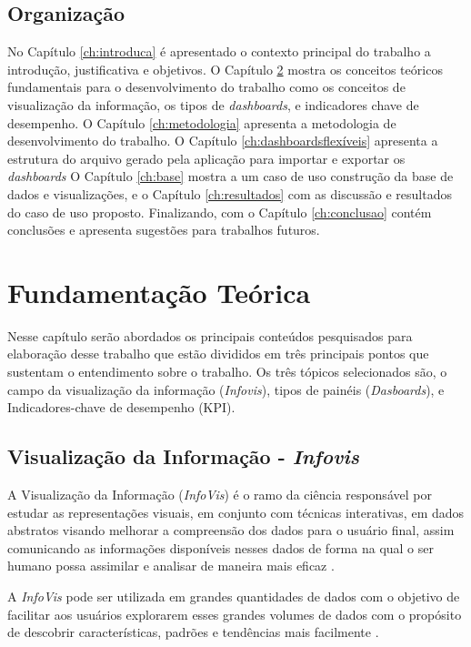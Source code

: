 \documentclass[
	12pt,				%
	openright,			%
	oneside,			%
	a4paper,			%
	english,			%
	brazil				%
	]{abntex2}
\begin{document}
\section{Organização}
\label{ch:organizacao}

No Capítulo \ref{ch:introduca} é apresentado o contexto principal do trabalho a introdução, justificativa e objetivos. O Capítulo \ref{ch:fundamentacao} mostra os conceitos teóricos fundamentais para o desenvolvimento do trabalho como os conceitos de visualização da informação, os tipos de \textit{dashboards}, e indicadores chave de desempenho. O  
Capítulo \ref{ch:metodologia} apresenta a metodologia de desenvolvimento do trabalho. O Capítulo \ref{ch:dashboardsflexíveis} apresenta a estrutura do arquivo gerado pela aplicação para importar e exportar os \textit{dashboards}
O Capítulo \ref{ch:base} mostra a um caso de uso construção da base de dados e visualizações, e o Capítulo \ref{ch:resultados} com as discussão e resultados do caso de uso proposto. Finalizando, com o Capítulo \ref{ch:conclusao} contém conclusões e apresenta sugestões para trabalhos futuros.





\chapter{Fundamentação Teórica}
\label{ch:fundamentacao}


Nesse capítulo serão abordados os principais conteúdos pesquisados para elaboração desse trabalho que estão divididos em três principais pontos que sustentam o entendimento sobre o trabalho. Os três tópicos selecionados são, o campo da visualização da informação (\textit{Infovis}), tipos de painéis (\textit{Dasboards}), e Indicadores-chave de desempenho (KPI).

\section{Visualização da Informação - \textit{Infovis}}
A Visualização da Informação (\textit{InfoVis}) é o ramo da ciência responsável por estudar as representações visuais, em conjunto com técnicas interativas, em dados abstratos visando melhorar a compreensão dos dados para o usuário final, assim comunicando as informações disponíveis nesses dados de forma na qual o ser humano possa assimilar e analisar de maneira mais eficaz \cite{few2009now}.

A  \textit{InfoVis} pode ser utilizada em grandes quantidades de dados com o objetivo de facilitar aos usuários explorarem esses grandes volumes de dados com o propósito de descobrir características, padrões e tendências mais facilmente \cite{Konstan}.
\end{document}
